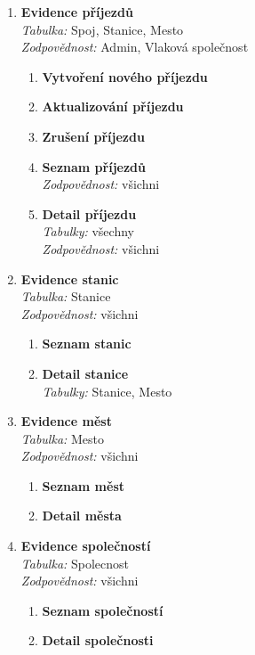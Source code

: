 \documentclass[11pt]{article}
\begin{document}
\begin{enumerate}
    \item \textbf{Evidence příjezdů}\\
        \textit{Tabulka:} Spoj, Stanice, Mesto\\
        \textit{Zodpovědnost:} Admin, Vlaková společnost
        \begin{enumerate}
            \item \textbf{Vytvoření nového příjezdu}
            \item \textbf{Aktualizování příjezdu}
            \item \textbf{Zrušení příjezdu}
            \item \textbf{Seznam příjezdů}\\
            \textit{Zodpovědnost:} všichni
            \item \textbf{Detail příjezdu}\\
            \textit{Tabulky:} všechny\\
            \textit{Zodpovědnost:} všichni
        \end{enumerate}

    \item \textbf{Evidence stanic}\\
        \textit{Tabulka:} Stanice\\
        \textit{Zodpovědnost:} všichni
        \begin{enumerate}
            \item \textbf{Seznam stanic}
            \item \textbf{Detail stanice}\\
            \textit{Tabulky:} Stanice, Mesto
        \end{enumerate}

    \item \textbf{Evidence měst}\\
        \textit{Tabulka:} Mesto\\
        \textit{Zodpovědnost:} všichni
        \begin{enumerate}
            \item \textbf{Seznam měst}
            \item \textbf{Detail města}
        \end{enumerate}

    \item \textbf{Evidence společností}\\
        \textit{Tabulka:} Spolecnost\\
        \textit{Zodpovědnost:} všichni
        \begin{enumerate}
            \item \textbf{Seznam společností}
            \item \textbf{Detail společnosti}
        \end{enumerate}
\end{enumerate}
\end{document}
